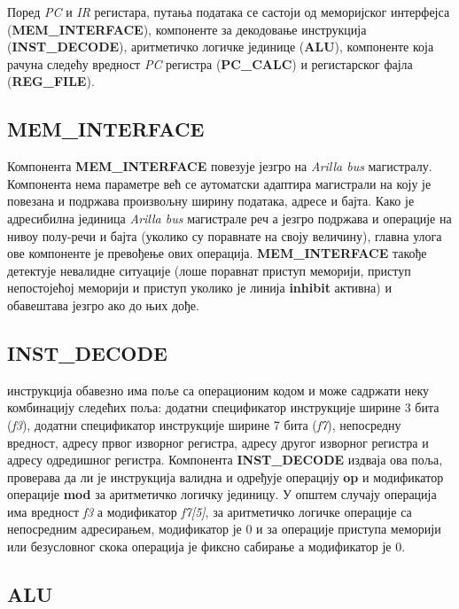 Поред \textit{\acrshort{PC}} и \textit{\acrshort{IR}} регистара, путања података се састоји од меморијског интерфејса\\ (\textbf{MEM\_INTERFACE}), компоненте за декодовање инструкција (\textbf{INST\_DECODE}), аритметичко логичке јединице (\textbf{ALU}), компоненте која рачуна следећу вредност \textit{\acrshort{PC}} регистра (\textbf{PC\_CALC}) и регистарског фајла (\textbf{REG\_FILE}).

\subsection{\textbf{MEM\_INTERFACE}}

Компонента \textbf{MEM\_INTERFACE} повезује језгро на \textit{Arilla bus} магистралу. Компонента нема параметре већ се аутоматски адаптира магистрали на коју је повезана и подржава произвољну ширину података, адресе и бајта. Како је адресибилна јединица \textit{Arilla bus} магистрале реч а језгро подржава и операције на нивоу полу-речи и бајта (уколико су поравнате на своју величину), главна улога ове компоненте је превођење ових операција. \textbf{MEM\_INTERFACE} такође детектује невалидне ситуације (лоше поравнат приступ меморији, приступ непостојећој меморији и приступ уколико је линија \textbf{inhibit} активна) и обавештава језгро ако до њих дође.

\subsection{\textbf{INST\_DECODE}}

 инструкција обавезно има поље са операционим кодом и може садржати неку комбинацију следећих поља: додатни спецификатор инструкције ширине 3 бита (\textit{f3}), додатни спецификатор инструкције ширине 7 бита (\textit{f7}), непосредну вредност, адресу првог изворног регистра, адресу другог изворног регистра и адресу одредишног регистра. Компонента \textbf{INST\_DECODE} издваја ова поља, проверава да ли је инструкција валидна и одређује операцију \textbf{op} и модификатор операције \textbf{mod} за аритметичко логичку јединицу. У општем случају операција има вредност \textit{f3} а модификатор \textit{f7[5]}, за аритметичко логичке операције са непосредним адресирањем, модификатор је 0 и за операције приступа меморији или безусловног скока операција је фиксно сабирање а модификатор је 0.


\subsection{\textbf{ALU}}

